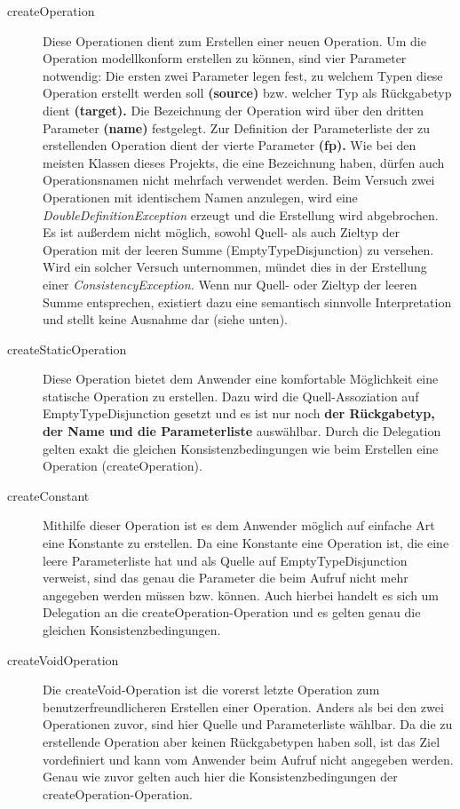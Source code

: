 \begin{description}
\item[createOperation]
Diese Operationen dient zum Erstellen einer neuen Operation. Um die Operation modellkonform erstellen zu können, sind vier Parameter notwendig:
Die ersten zwei Parameter legen fest, zu welchem Typen diese Operation erstellt werden soll \textbf{(source)} bzw. welcher Typ als Rückgabetyp dient \textbf{(target).}
Die Bezeichnung der Operation wird über den dritten Parameter \textbf{(name)} festgelegt. 
Zur Definition der Parameterliste der zu erstellenden Operation dient der vierte Parameter \textbf{(fp).}
Wie bei den meisten Klassen dieses Projekts, die eine Bezeichnung haben, dürfen auch Operationsnamen nicht mehrfach verwendet werden. Beim Versuch zwei Operationen mit identischem Namen anzulegen, wird eine \emph{DoubleDefinitionException} erzeugt und die Erstellung wird abgebrochen. Es ist außerdem nicht möglich, sowohl Quell- als auch Zieltyp der Operation mit der leeren Summe (EmptyTypeDisjunction) zu versehen. Wird ein solcher Versuch unternommen, mündet dies in der Erstellung einer \emph{ConsistencyException.} Wenn nur Quell- oder Zieltyp der leeren Summe entsprechen, existiert dazu eine semantisch sinnvolle Interpretation und stellt keine Ausnahme dar (siehe unten).
\item[createStaticOperation]
Diese Operation bietet dem Anwender eine komfortable Möglichkeit eine statische Operation zu erstellen. Dazu wird die Quell-Assoziation auf EmptyTypeDisjunction gesetzt und es ist nur noch \textbf{der Rückgabetyp, der Name und die Parameterliste} auswählbar. Durch die Delegation gelten exakt die gleichen Konsistenzbedingungen wie beim Erstellen eine Operation (createOperation).
\item[createConstant]
Mithilfe dieser Operation ist es dem Anwender möglich auf einfache Art eine Konstante zu erstellen. Da eine Konstante eine Operation ist, die eine leere Parameterliste hat und als Quelle auf EmptyTypeDisjunction verweist, sind das genau die Parameter die beim Aufruf nicht mehr angegeben werden müssen bzw. können. Auch hierbei handelt es sich um Delegation an die createOperation-Operation und es gelten genau die gleichen Konsistenzbedingungen.
\item[createVoidOperation]
Die createVoid-Operation ist die vorerst letzte Operation zum benutzerfreundlicheren Erstellen einer Operation. Anders als bei den zwei Operationen zuvor, sind hier Quelle und Parameterliste wählbar. Da die zu erstellende Operation aber keinen Rückgabetypen haben soll, ist das Ziel vordefiniert und kann vom Anwender beim Aufruf nicht angegeben werden. Genau wie zuvor gelten auch hier die Konsistenzbedingungen der createOperation-Operation.

\end{description}
